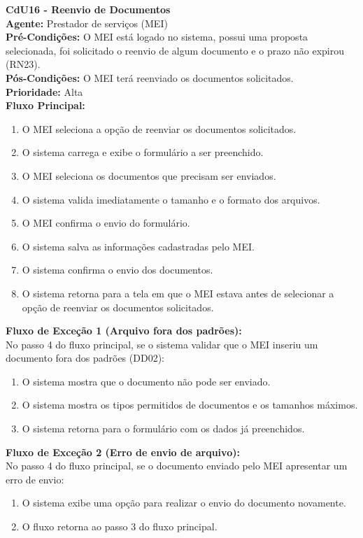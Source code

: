 \vspace{7pt}
\noindent\textbf{\normalsize CdU16 - Reenvio de Documentos}\\
\noindent\textbf{Agente:} Prestador de serviços (MEI)\\ 
\textbf{Pré-Condições:} O MEI está logado no sistema, possui uma proposta selecionada, foi solicitado o reenvio de algum documento e o prazo não expirou (RN23).\\ 
\textbf{Pós-Condições:} O MEI terá reenviado os documentos solicitados.\\
\textbf{Prioridade:} Alta \vspace{3pt}\\
\noindent\textbf{Fluxo Principal:}
\begin{enumerate}[noitemsep, topsep=-5pt, parsep=0pt]
    \item O MEI seleciona a opção de reenviar os documentos solicitados.
    \item O sistema carrega e exibe o formulário a ser preenchido.
    \item O MEI seleciona os documentos que precisam ser enviados.
    \item O sistema valida imediatamente o tamanho e o formato dos arquivos.
    \item O MEI confirma o envio do formulário.
    \item O sistema salva as informações cadastradas pelo MEI.
    \item O sistema confirma o envio dos documentos.
    \item O sistema retorna para a tela em que o MEI estava antes de selecionar a opção de reenviar os documentos solicitados.
\end{enumerate}

\noindent\textbf{Fluxo de Exceção 1 (Arquivo fora dos padrões):}\\
No passo 4 do fluxo principal, se o sistema validar que o MEI inseriu um documento fora dos padrões (DD02):
\begin{enumerate}[noitemsep, topsep=-5pt, parsep=0pt]
    \item O sistema mostra que o documento não pode ser enviado.
    \item O sistema mostra os tipos permitidos de documentos e os tamanhos máximos.
    \item O sistema retorna para o formulário com os dados já preenchidos.
\end{enumerate}

\noindent\textbf{Fluxo de Exceção 2 (Erro de envio de arquivo):}\\
No passo 4 do fluxo principal, se o documento enviado pelo MEI apresentar um erro de envio:
\begin{enumerate}[noitemsep, topsep=-5pt, parsep=0pt]
    \item O sistema exibe uma opção para realizar o envio do documento novamente.
    \item O fluxo retorna ao passo 3 do fluxo principal.
\end{enumerate}

